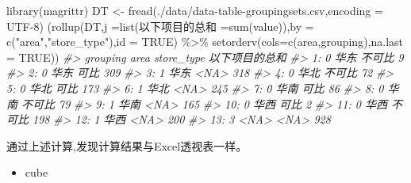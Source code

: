 \documentclass[
]{book}
\newenvironment{Shaded}{\begin{snugshade}}{\end{snugshade}}
\newcommand{\AttributeTok}[1]{\textcolor[rgb]{0.77,0.63,0.00}{#1}}
\newcommand{\CommentTok}[1]{\textcolor[rgb]{0.56,0.35,0.01}{\textit{#1}}}
\newcommand{\ConstantTok}[1]{\textcolor[rgb]{0.00,0.00,0.00}{#1}}
\newcommand{\FunctionTok}[1]{\textcolor[rgb]{0.00,0.00,0.00}{#1}}
\newcommand{\NormalTok}[1]{#1}
\newcommand{\OtherTok}[1]{\textcolor[rgb]{0.56,0.35,0.01}{#1}}
\newcommand{\SpecialCharTok}[1]{\textcolor[rgb]{0.00,0.00,0.00}{#1}}
\newcommand{\StringTok}[1]{\textcolor[rgb]{0.31,0.60,0.02}{#1}}
\providecommand{\tightlist}{%
  \setlength{\itemsep}{0pt}\setlength{\parskip}{0pt}}
\begin{document}
\begin{Shaded}
\begin{Highlighting}[]
\FunctionTok{library}\NormalTok{(magrittr)}
\NormalTok{DT }\OtherTok{\textless{}{-}} \FunctionTok{fread}\NormalTok{(}\StringTok{\textquotesingle{}./data/data{-}table{-}groupingsets.csv\textquotesingle{}}\NormalTok{,}\AttributeTok{encoding =} \StringTok{\textquotesingle{}UTF{-}8\textquotesingle{}}\NormalTok{)}
\NormalTok{(}\FunctionTok{rollup}\NormalTok{(DT,}\AttributeTok{j =}\FunctionTok{list}\NormalTok{(以下项目的总和 }\OtherTok{=}\FunctionTok{sum}\NormalTok{(value)),}\AttributeTok{by =} \FunctionTok{c}\NormalTok{(}\StringTok{"area"}\NormalTok{,}\StringTok{"store\_type"}\NormalTok{),}\AttributeTok{id =} \ConstantTok{TRUE}\NormalTok{) }\SpecialCharTok{\%\textgreater{}\%} \FunctionTok{setorderv}\NormalTok{(}\AttributeTok{cols=}\FunctionTok{c}\NormalTok{(}\StringTok{\textquotesingle{}area\textquotesingle{}}\NormalTok{,}\StringTok{\textquotesingle{}grouping\textquotesingle{}}\NormalTok{),}\AttributeTok{na.last =} \ConstantTok{TRUE}\NormalTok{))}
\CommentTok{\#\textgreater{}     grouping area store\_type 以下项目的总和}
\CommentTok{\#\textgreater{}  1:        0 华东     不可比              9}
\CommentTok{\#\textgreater{}  2:        0 华东       可比            309}
\CommentTok{\#\textgreater{}  3:        1 华东       \textless{}NA\textgreater{}            318}
\CommentTok{\#\textgreater{}  4:        0 华北     不可比             72}
\CommentTok{\#\textgreater{}  5:        0 华北       可比            173}
\CommentTok{\#\textgreater{}  6:        1 华北       \textless{}NA\textgreater{}            245}
\CommentTok{\#\textgreater{}  7:        0 华南       可比             86}
\CommentTok{\#\textgreater{}  8:        0 华南     不可比             79}
\CommentTok{\#\textgreater{}  9:        1 华南       \textless{}NA\textgreater{}            165}
\CommentTok{\#\textgreater{} 10:        0 华西       可比              2}
\CommentTok{\#\textgreater{} 11:        0 华西     不可比            198}
\CommentTok{\#\textgreater{} 12:        1 华西       \textless{}NA\textgreater{}            200}
\CommentTok{\#\textgreater{} 13:        3 \textless{}NA\textgreater{}       \textless{}NA\textgreater{}            928}
\end{Highlighting}
\end{Shaded}

通过上述计算,发现计算结果与Excel透视表一样。

\begin{itemize}
\tightlist
\item
  cube
\end{itemize}
\end{document}
